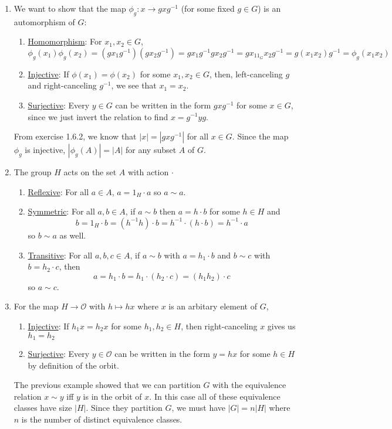 \documentclass[]{article}
\newcommand{\abs}[1]{\left\vert #1 \right\vert}
\begin{document}
\begin{enumerate}
\item We want to show that the map $\phi_g: x \to gxg^{-1}$ (for some fixed $g\in G$) is an automorphism of $G$:
\begin{enumerate}
\item \underline{Homomorphism}: For $x_1,x_2 \in G$,
\begin{equation}
\phi_g(x_1)\phi_g(x_2) = (gx_1g^{-1})(gx_2g^{-1}) = gx_1g^{-1}gx_2g^{-1} = gx_11_Gx_2g^{-1} = g(x_1x_2)g^{-1} = \phi_g(x_1x_2)
\end{equation}
\item \underline{Injective}: If $\phi(x_1) = \phi(x_2)$ for some $x_1,x_2\in G$, then, left-canceling $g$ and right-canceling $g^{-1}$, we see that $x_1 = x_2$.
\item \underline{Surjective}: Every $y\in G$ can be written in the form $gxg^{-1}$ for some $x\in G$, since we just invert the relation to find $x = g^{-1}yg$.
\end{enumerate}
From exercise 1.6.2, we know that $\abs{x} = \abs{gxg^{-1}}$ for all $x\in G$. Since the map $\phi_g$ is injective, $\abs{\phi_g(A)} = \abs{A}$ for any subset $A$ of $G$.


\item The group $H$ acts on the set $A$ with action $\cdot$
\begin{enumerate}
\item \underline{Reflexive}: For all $a \in A$, $a = 1_H \cdot a$ so $a \sim a$.
\item \underline{Symmetric}: For all $a,b \in A$, if $a\sim b$ then $a = h \cdot b$ for some $h\in H$ and
\begin{equation}
b = 1_H \cdot b = (h^{-1}h)\cdot b = h^{-1} \cdot (h \cdot b) = h^{-1}\cdot a
\end{equation}
so $b \sim a$ as well.
\item \underline{Transitive}: For all $a,b,c \in A$, if $a\sim b$ with $a = h_1 \cdot b$ and $b\sim c$ with $b = h_2 \cdot c$, then
\begin{equation}
a = h_1\cdot b = h_1\cdot (h_2\cdot c) = (h_1h_2)\cdot c
\end{equation}
so $a \sim c$.
\end{enumerate}


\item For the map $H \to \mathcal{O}$ with $h \mapsto hx$ where $x$ is an arbitary element of $G$,
\begin{enumerate}
\item \underline{Injective}: If $h_1x = h_2x$ for some $h_1,h_2\in H$, then right-canceling $x$ gives us $h_1 = h_2$
\item \underline{Surjective}: Every $y \in \mathcal{O}$ can be written in the form $y = hx$ for some $h\in H$ by definition of the orbit.
\end{enumerate}
The previous example showed that we can partition $G$ with the equivalence relation $x\sim y$ iff $y$ is in the orbit of $x$. In this case all of these equivalence classes have size $\abs{H}$. Since they partition $G$, we must have $\abs{G} = n\abs{H}$ where $n$ is the number of distinct equivalence classes.



\end{enumerate}
\end{document}
